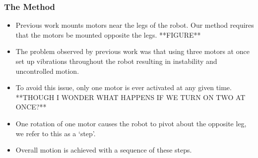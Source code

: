 \documentclass{beamer}
\begin{document}
\begin{frame}
	\frametitle{The Method}
	\begin{itemize}
		\item Previous work mounts motors near the legs of the robot. Our method requires that the motors be mounted opposite the legs. **FIGURE** 
		\item The problem observed by previous work was that using three motors at once set up vibrations throughout the robot resulting in instability and uncontrolled motion.	
		\item To avoid this issue, only one motor is ever activated at any given time. **THOUGH I WONDER WHAT HAPPENS IF WE TURN ON TWO AT ONCE?**
		\item One rotation of one motor causes the robot to pivot about the opposite leg, we refer to this as a `step'.
		\item Overall motion is achieved with a sequence of these steps.
	\end{itemize}
\end{frame}
\end{document}
